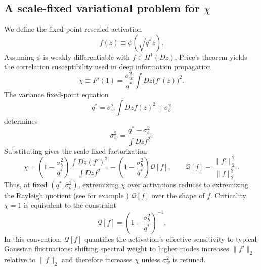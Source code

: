\documentclass{article}
\theoremstyle{plain}
\theoremstyle{definition}
\theoremstyle{remark}
\begin{document}
\subsection{A scale-fixed variational problem for $\chi$}
\label{sec:var-chi}

We define the fixed-point rescaled activation
\relax
\begin{equation}
f(z) \equiv \phi(\sqrt{q^*} z).
\end{equation}
\relax
Assuming $\phi$ is weakly differentiable with $f \in H^1(Dz)$, Price's theorem \cite{Price1958GaussianInputs} yields the correlation susceptibility used in deep information propagation \cite{schoenholz2017deepinformationpropagation}
\relax
\begin{equation}
\chi \equiv F'(1) = \frac{\sigma_w^2}{q^*}\int Dz \bigl(f'(z)\bigr)^2 .
\end{equation}
\relax
The variance fixed-point equation
\relax
\begin{equation}
q^* = \sigma_w^2 \int Dz f(z)^2 + \sigma_b^2
\end{equation}
\relax
determines
\relax
\begin{equation}
\sigma_w^2 = \frac{q^*-\sigma_b^2}{\int Dz f^2}.
\end{equation}
\relax
Substituting gives the scale-fixed factorization
\relax
\begin{equation}
\chi = \left(1-\frac{\sigma_b^2}{q^*}\right) \frac{\int Dz (f')^2}{\int Dz f^2} \equiv \left(1-\frac{\sigma_b^2}{q^*}\right) \mathcal{Q}[f], \qquad \mathcal{Q}[f]\equiv \frac{\|f'\|_2^2}{\|f\|_2^2}.
\label{eq:chi-factorization}
\end{equation}
\relax
Thus, at fixed $(q^*,\sigma_b^2)$, extremizing $\chi$ over activations reduces to extremizing the Rayleigh quotient (see for example \cite{Horn_Johnson_1985}) $\mathcal{Q}[f]$ over the shape of $f$. Criticality $\chi=1$ is equivalent to the constraint
\relax
\begin{equation}
\mathcal{Q}[f] = \left(1-\frac{\sigma_b^2}{q^*}\right)^{-1}.
\end{equation}
\relax
In this convention, $\mathcal{Q}[f]$ quantifies the activation's effective sensitivity to typical Gaussian fluctuations: shifting spectral weight to higher modes increases $\|f'\|_2$ relative to $\|f\|_2$ and therefore increases $\chi$ unless $\sigma_w^2$ is retuned.
\end{document}
